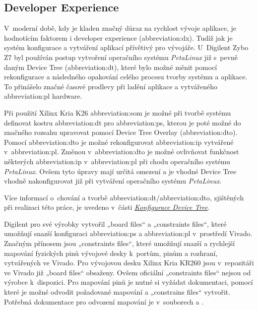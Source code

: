 \documentclass[a4paper, twoside, 11pt]{article}
\begin{document}
			\subsection{Developer Experience}
					V~moderní době, kdy je kladen značný důraz na rychlost vývoje aplikace, je hodnotícím faktorem i developer experience (\gls{abbreviation:dx}). Tudíž jak je systém konfigurace a vytváření aplikací přívětivý pro vývojáře. U~Digilent Zybo Z7 byl používán postup vytvoření operačního systému \textit{PetaLinux} již s~pevně daným Device Tree (\gls{abbreviation:dt}), které bylo možné měnit pomocí rekonfigurace a následného opakování celého procesu tvorby systému a aplikace. To přinášelo značné časové prodlevy při ladění aplikace a vytvářeného \gls{abbreviation:pl} hardware.\par
					Při použití Xilinx Kria K26 \gls{abbreviation:som} je možné při tvorbě systému definovat kostru \gls{abbreviation:dt} pro \gls{abbreviation:ps}, kterou je poté možné do značného rozsahu upravovat pomocí Device Tree Overlay (\gls{abbreviation:dto}). Pomocí \gls{abbreviation:dto} je možné rekonfigurovat \gls{abbreviation:ip} vytvářené v~\gls{abbreviation:pl}. Změnou v~\gls{abbreviation:dto} je možné ovlivňovat funkčnost některých \gls{abbreviation:ip} v~\gls{abbreviation:pl} při chodu operačního systému \textit{PetaLinux}. Ovšem tyto úpravy mají určitá omezení a je vhodné Device Tree vhodně nakonfigurovat již při vytváření operačního systému \textit{PetaLinux}.\par
					Více informací o~chování a tvorbě \gls{abbreviation:dt}/\gls{abbreviation:dto}, zjištěných při realizaci této práce, je uvedeno v~části \hyperref[subsubsec:konfigurace-device-tree]{\textit{Konfigurace Device Tree}}.\par
					Digilent pro své výrobky vytvořil „board files“ a „constraints files“, které umožňují snazší konfiguraci \gls{abbreviation:ps} a \gls{abbreviation:pl} v~prostředí Vivado. Značným přínosem jsou „constraints files“, které umožňují snazší a rychlejší mapování fyzických pinů vývojové desky k~portům, pinům a rozhraní, vytvářených ve Vivado. Pro vývojovou desku Xilinx Kria KR260 jsou v~repozitáři ve Vivado již „board files“ obsaženy. Ovšem oficiální „constraints files“ nejsou od výrobce k~dispozici. Pro mapování pinů je nutné si vyžádat dokumentaci, pomocí které je možné odvodit požadované mapování a „constrains files“ vytvořit. Potřebná dokumentace pro odvození mapování je v~souborech \cite{kria-kr260-starter-kit-cc-schematics} a \cite{kria-k26-som-xdc}.
			
\end{document}
